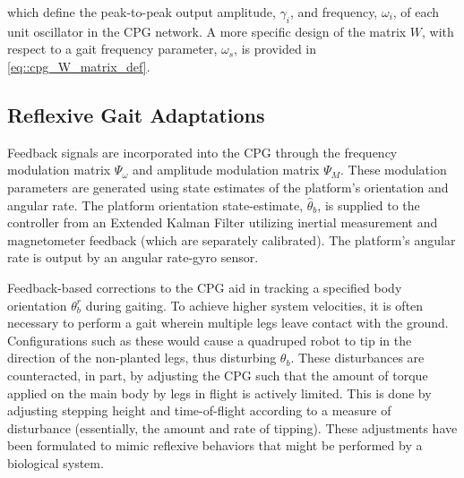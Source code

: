 		which define the peak-to-peak output amplitude, $\gamma_{i}$, and frequency, $\omega_{i}$, of each \Ith unit oscillator in the CPG network. A more specific design of the matrix $W$, with respect to a gait frequency parameter, $\omega_{s}$, is provided in \ref{eq::cpg_W_matrix_def}.


		\subsection{Reflexive Gait Adaptations}

			Feedback signals are incorporated into the CPG through the frequency modulation matrix $\Psi_{\omega}$ and amplitude modulation matrix $\Psi_{M}$. These modulation parameters are generated using state estimates of the platform's orientation and angular rate. The platform orientation state-estimate, $\hat{\theta}_{b}$, is supplied to the controller from an Extended Kalman Filter utilizing inertial measurement and magnetometer feedback (which are separately calibrated). The platform's angular rate is output by an angular rate-gyro sensor.

			Feedback-based corrections to the CPG aid in tracking a specified body orientation $\theta_{b}^{r}$ during gaiting. To achieve higher system velocities, it is often necessary to perform a gait wherein multiple legs leave contact with the ground. Configurations such as these would cause a quadruped robot to tip in the direction of the non-planted legs, thus disturbing $\theta_{b}$. These disturbances are counteracted, in part, by adjusting the CPG such that the amount of torque applied on the main body by legs in flight is actively limited. This is done by adjusting stepping height and time-of-flight according to a measure of disturbance (essentially, the amount and rate of tipping). These adjustments have been formulated to mimic reflexive behaviors that might be performed by a biological system.

